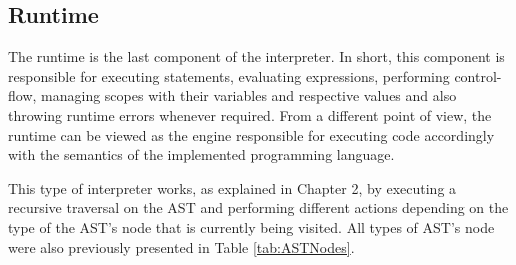 \subsection{Runtime}
The runtime is the last component of the interpreter. In short, this component is responsible for executing statements, evaluating expressions, performing control-flow, managing scopes with their variables and respective values and also throwing runtime errors whenever required. From a different point of view, the runtime can be viewed as the engine responsible for executing code accordingly with the semantics of the implemented programming language.

This type of interpreter works, as explained in Chapter 2, by executing a recursive traversal on the AST and performing different actions depending on the type of the AST's node that is currently being visited. All types of AST's node were also previously presented in Table \ref{tab:ASTNodes}.

